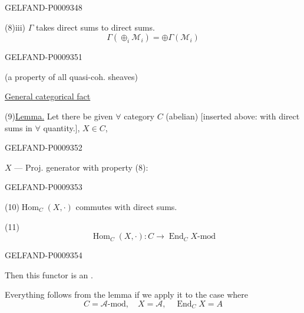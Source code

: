 \begin{GelfandAdjacentEvidence}{GELFAND-P000934}{8}


(8)\quad iii) $\Gamma$ takes direct sums to direct sums.
\[
 \Gamma(\oplus_i\mathcal M_i)=\oplus\Gamma(\mathcal M_i)
\]
\end{GelfandAdjacentEvidence}


\begin{GelfandAdjacentEvidence}{GELFAND-P000935}{1}

(a property of all quasi-coh. sheaves)

\underline{General categorical fact}

(9)\quad \underline{Lemma.} Let there be given $\forall$ category $C$ (abelian)
[inserted above: with direct sums in $\forall$ quantity.], $X\in C$,
\end{GelfandAdjacentEvidence}
\begin{GelfandAdjacentEvidence}{GELFAND-P000935}{2}


$X$ --- Proj. generator with property (8):
\end{GelfandAdjacentEvidence}
\begin{GelfandAdjacentEvidence}{GELFAND-P000935}{3}


(10)\quad $\operatorname{Hom}_C(X,\cdot)$ commutes with direct sums.

(11)
\[
 \operatorname{Hom}_C(X,\cdot):C\longrightarrow\operatorname{End}_C X\text{-mod}
\]
\end{GelfandAdjacentEvidence}
\begin{GelfandAdjacentEvidence}{GELFAND-P000935}{4}


Then this functor is an .

Everything follows from the lemma if we apply it to the case where
\begin{equation*}
 C=\mathcal A\text{-mod},\quad X=\mathcal A,\quad\operatorname{End}_C X=A
 \tag{12}
\end{equation*}
\end{GelfandAdjacentEvidence}
